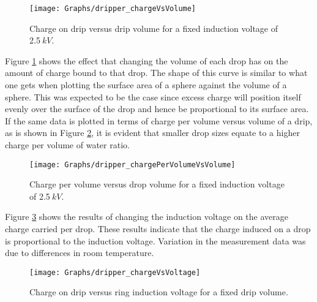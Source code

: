 \begin{figure}[H]
\begin{centering}
\texttt{[image: Graphs/dripper\_chargeVsVolume]}
\par\end{centering}

\protect\caption{\label{Graph_dripperExperiment_chargeVsVolume}Charge on drip versus
drip volume for a fixed induction voltage of 2.5$\: kV$.}
\end{figure}
Figure \ref{Graph_dripperExperiment_chargeVsVolume} shows the effect
that changing the volume of each drop has on the amount of charge
bound to that drop. The shape of this curve is similar to what one
gets when plotting the surface area of a sphere against the volume
of a sphere. This was expected to be the case since excess charge
will position itself evenly over the surface of the drop and hence
be proportional to its surface area. If the same data is plotted in
terms of charge per volume versus volume of a drip, as is shown in
Figure \ref{Figure_Graph_dripper_chargePerVolumeVsVolume}, it is
evident that smaller drop sizes equate to a higher charge per volume
of water ratio.

\begin{figure}[h]
\begin{centering}
\texttt{[image: Graphs/dripper\_chargePerVolumeVsVolume]}
\par\end{centering}

\protect\caption{\label{Figure_Graph_dripper_chargePerVolumeVsVolume}Charge per volume
versus drop volume for a fixed induction voltage of 2.5$\: kV$.}


\end{figure}


Figure \ref{Figure_Graph_dripper_chargeVsVoltage} shows the results
of changing the induction voltage on the average charge carried per
drop. These results indicate that the charge induced on a drop is
proportional to the induction voltage. Variation in the measurement
data was due to differences in room temperature.

\begin{figure}
\begin{centering}
\texttt{[image: Graphs/dripper\_chargeVsVoltage]}
\par\end{centering}

\protect\caption{\label{Figure_Graph_dripper_chargeVsVoltage}Charge on drip versus
ring induction voltage for a fixed drip volume.}
\end{figure}


